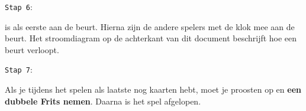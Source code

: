 \noindent
\begin{minipage}[t]{.09\textwidth}
\texttt{Stap 6}:
\end{minipage}
\hfill
\begin{minipage}[t]{.91\textwidth}
\Willem is als eerste aan de beurt. Hierna zijn de andere spelers met de klok mee aan de beurt. Het stroomdiagram op de achterkant van dit document beschrijft hoe een beurt verloopt. \\
\end{minipage}

\noindent
\begin{minipage}[t]{.09\textwidth}
\texttt{Stap 7}:
\end{minipage}
\hfill
\begin{minipage}[t]{.91\textwidth}
Als je tijdens het spelen als laatste nog kaarten hebt, moet je proosten op  en \textbf{een dubbele Frits nemen}. Daarna is het spel afgelopen.  \\
\end{minipage}




